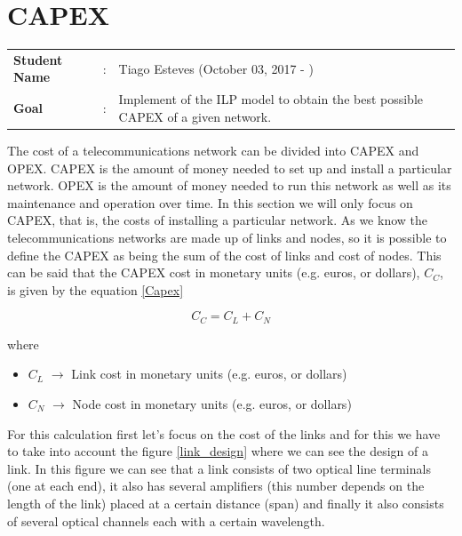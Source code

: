 \clearpage

\section{CAPEX}\label{ILP_CAPEX}
\begin{tcolorbox}	
\begin{tabular}{p{2.75cm} p{0.2cm} p{10.5cm}} 	
\textbf{Student Name}  &:& Tiago Esteves    (October 03, 2017 - )\\
\textbf{Goal}          &:& Implement of the ILP model to obtain the best possible CAPEX of a given network.
\end{tabular}
\end{tcolorbox}
\vspace{11pt}

The cost of a telecommunications network can be divided into CAPEX and OPEX.
CAPEX is the amount of money needed to set up and install a particular network.
OPEX is the amount of money needed to run this network as well as its maintenance and operation over time.
In this section we will only focus on CAPEX, that is, the costs of installing a particular network.
As we know the telecommunications networks are made up of links and nodes, so it is possible to define the CAPEX as being the sum of the cost of links and cost of nodes.
This can be said that the CAPEX cost in monetary units (e.g. euros, or dollars), $C_C$, is given by the equation \ref{Capex}

\begin{equation}
C_C = C_L + C_N
\label{Capex}
\end{equation}

where
\begin{itemize}
\item{$C_L$				$\rightarrow$	Link cost in monetary units (e.g. euros, or dollars)}
\item{$C_N$				$\rightarrow$	Node cost in monetary units (e.g. euros, or dollars)}
\end{itemize}


\vspace{11pt}
For this calculation first let's focus on the cost of the links and for this we have to take into account the figure \ref{link_design} where we can see the design of a link. In this figure we can see that a link consists of two optical line terminals (one at each end), it also has several amplifiers (this number depends on the length of the link) placed at a certain distance (span) and finally it also consists of several optical channels each with a certain wavelength.

